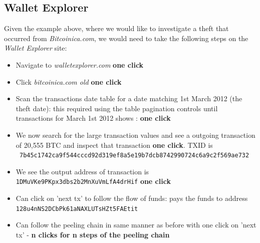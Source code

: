 \subsection{Wallet Explorer}
Given the example above, where we would like to investigate a theft that occurred from \textit{Bitcoinica.com}, we would need to take the following steps on the \textit{Wallet Explorer} site:
\begin{itemize}
    \item Navigate to \textit{walletexplorer.com} \textbf{one click}
    \item Click \textit{bitcoinica.com old} \textbf{one click}
    \item Scan the transactions date table for a date matching 1st March 2012 (the theft date): this required using the table pagination controls until transactions for March 1st 2012 shows : \textbf{one click}
    \item We now search for the large transaction values and see a outgoing transaction of 20,555 BTC and inspect that transaction \textbf{one click}. TXID is \\\texttt{    7b45c1742ca9f544cccd92d319ef8a5e19b7dcb8742990724c6a9c2f569ae732}
    \item We see the output address of transaction is \texttt{ 1DMuVKe9PKpx3dbs2b2MnXuVmLfA4drHif} \textbf{one click}
    \item Can click on 'next tx' to follow the flow of funds: pays the funds to address \\\texttt{128u4nNS2DCbPk61aNAXLUTsHZt5FAEtit}
    \item Can follow the peeling chain in same manner as before with one click on 'next tx' - \textbf{n clicks for n steps of the peeling chain}
\end{itemize}

